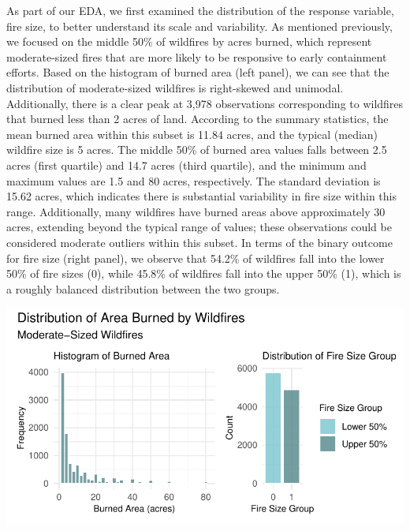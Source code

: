 \documentclass[
  letterpaper,
  DIV=11,
  numbers=noendperiod]{scrartcl}
\begin{document}
As part of our EDA, we first examined the distribution of the response
variable, fire size, to better understand its scale and variability. As
mentioned previously, we focused on the middle 50\% of wildfires by
acres burned, which represent moderate-sized fires that are more likely
to be responsive to early containment efforts. Based on the histogram of
burned area (left panel), we can see that the distribution of
moderate-sized wildfires is right-skewed and unimodal. Additionally,
there is a clear peak at 3,978 observations corresponding to wildfires
that burned less than 2 acres of land. According to the summary
statistics, the mean burned area within this subset is 11.84 acres, and
the typical (median) wildfire size is 5 acres. The middle 50\% of burned
area values falls between 2.5 acres (first quartile) and 14.7 acres
(third quartile), and the minimum and maximum values are 1.5 and 80
acres, respectively. The standard deviation is 15.62 acres, which
indicates there is substantial variability in fire size within this
range. Additionally, many wildfires have burned areas above
approximately 30 acres, extending beyond the typical range of values;
these observations could be considered moderate outliers within this
subset. In terms of the binary outcome for fire size (right panel), we
observe that 54.2\% of wildfires fall into the lower 50\% of fire sizes
(0), while 45.8\% of wildfires fall into the upper 50\% (1), which is a
roughly balanced distribution between the two groups.

\includegraphics{written-report_files/figure-pdf/fire-size-dist-1.pdf}
\end{document}
